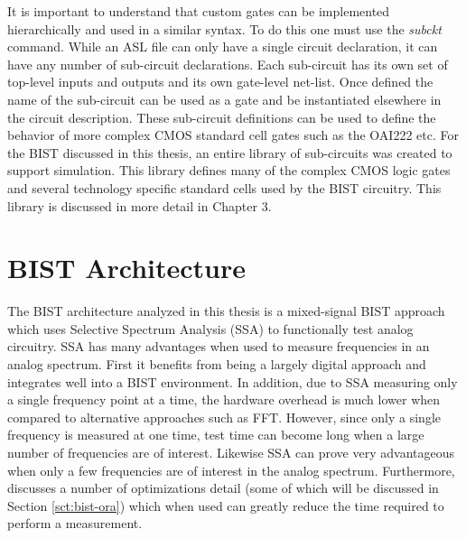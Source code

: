 \documentclass[12pt]{report}
\begin{document}
It is important to understand that custom gates can be implemented hierarchically and used in a similar syntax.  To do this one must use the \textit{subckt} command.  While an ASL file can only have a single circuit declaration, it can have any number of sub-circuit declarations\cite{asl}.  Each sub-circuit has its own set of top-level inputs and outputs and its own gate-level net-list.  Once defined the name of the sub-circuit can be used as a gate and be instantiated elsewhere in the circuit description.  These sub-circuit definitions can be used to define the behavior of more complex CMOS standard cell gates such as the OAI222 etc.  For the BIST discussed in this thesis, an entire library of sub-circuits was created to support simulation.  This library defines many of the complex CMOS logic gates and several technology specific standard cells used by the BIST circuitry.  This library is discussed in more detail in Chapter 3.

\section{BIST Architecture}
The BIST architecture analyzed in this thesis is a mixed-signal BIST approach which uses Selective Spectrum Analysis (SSA) to functionally test analog circuitry\cite{jie-journal}.  SSA has many advantages when used to measure frequencies in an analog spectrum.  First it benefits from being a largely digital approach and integrates well into a BIST environment.  In addition, due to SSA measuring only a single frequency point at a time, the hardware overhead is much lower when compared to alternative approaches such as FFT\cite{stroud-phase}. However, since only a single frequency is measured at one time, test time can become long when a large number of frequencies are of interest.  Likewise SSA can prove very advantageous when only a few frequencies are of interest in the analog spectrum\cite{jie-journal}.  Furthermore, \cite{jie} discusses a number of optimizations detail (some of which will be discussed in Section \ref{sct:bist-ora}) which when used can greatly reduce the time required to perform a measurement.
\end{document}
